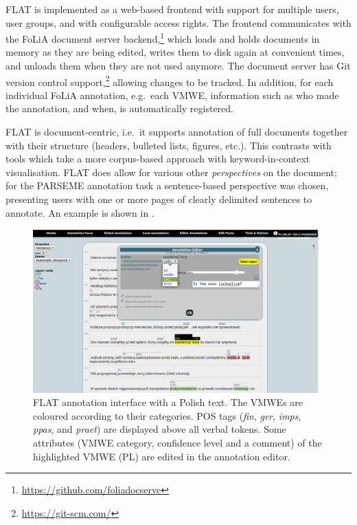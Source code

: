 \documentclass[output=paper,
modfonts,
]{langscibook}
\begin{document}
FLAT is implemented as a web-based frontend with support for multiple users, user groups, and with configurable access rights. The frontend communicates with the FoLiA document server
backend,\footnote{\scriptsize{\url{https://github.com/foliadocserve}}} which loads and holds documents in memory as they are being edited, writes them to disk again at convenient times, and unloads them when they are not used anymore. The document server has Git version control support,\footnote{\scriptsize{\url{https://git-scm.com/}}} allowing changes to be tracked. In addition, for each individual FoLiA annotation, %
e.g.\ each VMWE, %
information  such as who made the annotation, and when, is automatically registered.

FLAT is document-centric, i.e.\ it supports annotation of full documents together with their structure  (headers, bulleted lists, figures, etc.). 
This %
contrasts with tools which take a more corpus-based approach with keyword-in-context visualisation. FLAT does allow for various other \emph{perspectives} on 
the document; for the PARSEME annotation task a sentence-based perspective was chosen, presenting users with one or more pages of clearly delimited sentences to annotate. An example is shown in .

\begin{figure}
\includegraphics[width=0.98\textwidth]{figures/flat-pl.png}
\caption{FLAT annotation interface with a Polish text. The VMWEs are coloured according to their categories. POS tags (\textit{fin}, \textit{ger}, \textit{imps}, \textit{ppas}, and \textit{praet}) are displayed above all verbal tokens. Some attributes (VMWE category, confidence level and a comment) of the highlighted VMWE (PL)  are edited in the annotation editor.}
\label{fig:flat1}
\end{figure}
\end{document}
